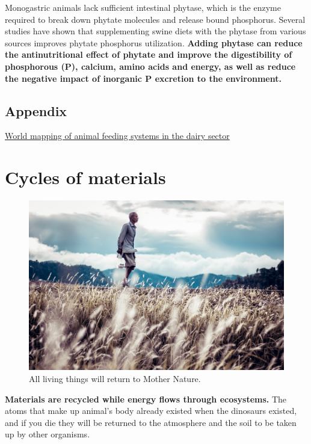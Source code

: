 \documentclass[]{book}
\begin{document}
Monogastric animals lack sufficient intestinal phytase, which is the enzyme required to break down phytate molecules and release bound phosphorus. Several studies have shown that supplementing swine diets with the phytase from various sources improves phytate phosphorus utilization. \textbf{Adding phytase can reduce the antinutritional effect of phytate and improve the digestibility of phosphorous (P), calcium, amino acids and energy, as well as reduce the negative impact of inorganic P excretion to the environment.}

\hypertarget{appendix-3}{%
\section{Appendix}\label{appendix-3}}

\href{http://www.fao.org/3/a-i3913e.pdf}{World mapping of animal feeding systems in the dairy sector}

\hypertarget{cycles-of-materials}{%
\chapter{Cycles of materials}\label{cycles-of-materials}}

\begin{figure}

{\centering \includegraphics[width=1\linewidth]{figures/oldman} 

}

\caption{All living things will return to Mother Nature.}\label{fig:oldman}
\end{figure}

\textbf{Materials are recycled while energy flows through ecosystems.} The atoms that make up animal's body already existed when the dinosaurs existed, and if you die they will be returned to the atmosphere and the soil to be taken up by other organisms.
\end{document}
